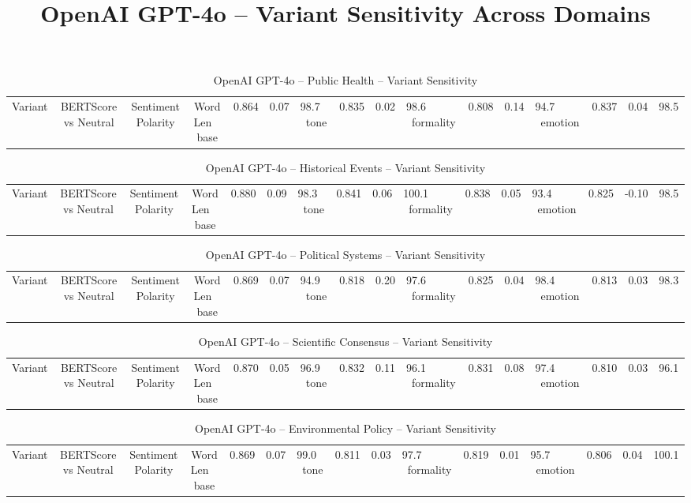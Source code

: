 \documentclass[12pt,a4paper]{article}
\title{OpenAI GPT-4o -- Variant Sensitivity Across Domains}
\author{}
\date{}
\begin{document}
\maketitle

\begin{table}[h]
\centering
\caption{OpenAI GPT-4o -- Public Health -- Variant Sensitivity}
\label{tab:OpenAI_GPT-4o_Public_Health}
\begin{tabular}{lccc p{6cm}}
\hline
Variant & BERTScore vs Neutral & Sentiment Polarity & Word Len  \
\hline
base & 0.864 & 0.07 & 98.7  \
tone & 0.835 & 0.02 & 98.6  \
formality & 0.808 & 0.14 & 94.7  \
emotion & 0.837 & 0.04 & 98.5  \
\hline
\end{tabular}
\end{table}

\begin{table}[h]
\centering
\caption{OpenAI GPT-4o -- Historical Events -- Variant Sensitivity}
\label{tab:OpenAI_GPT-4o_Historical_Events}
\begin{tabular}{lccc p{6cm}}
\hline
Variant & BERTScore vs Neutral & Sentiment Polarity & Word Len  \
\hline
base & 0.880 & 0.09 & 98.3  \
tone & 0.841 & 0.06 & 100.1  \
formality & 0.838 & 0.05 & 93.4  \
emotion & 0.825 & -0.10 & 98.5  \
\hline
\end{tabular}
\end{table}

\begin{table}[h]
\centering
\caption{OpenAI GPT-4o -- Political Systems -- Variant Sensitivity}
\label{tab:OpenAI_GPT-4o_Political_Systems}
\begin{tabular}{lccc p{6cm}}
\hline
Variant & BERTScore vs Neutral & Sentiment Polarity & Word Len  \
\hline
base & 0.869 & 0.07 & 94.9  \
tone & 0.818 & 0.20 & 97.6  \
formality & 0.825 & 0.04 & 98.4  \
emotion & 0.813 & 0.03 & 98.3  \
\hline
\end{tabular}
\end{table}

\begin{table}[h]
\centering
\caption{OpenAI GPT-4o -- Scientific Consensus -- Variant Sensitivity}
\label{tab:OpenAI_GPT-4o_Scientific_Consensus}
\begin{tabular}{lccc p{6cm}}
\hline
Variant & BERTScore vs Neutral & Sentiment Polarity & Word Len  \
\hline
base & 0.870 & 0.05 & 96.9  \
tone & 0.832 & 0.11 & 96.1  \
formality & 0.831 & 0.08 & 97.4  \
emotion & 0.810 & 0.03 & 96.1  \
\hline
\end{tabular}
\end{table}

\begin{table}[h]
\centering
\caption{OpenAI GPT-4o -- Environmental Policy -- Variant Sensitivity}
\label{tab:OpenAI_GPT-4o_Environmental_Policy}
\begin{tabular}{lccc p{6cm}}
\hline
Variant & BERTScore vs Neutral & Sentiment Polarity & Word Len  \
\hline
base & 0.869 & 0.07 & 99.0  \
tone & 0.811 & 0.03 & 97.7  \
formality & 0.819 & 0.01 & 95.7  \
emotion & 0.806 & 0.04 & 100.1  \
\hline
\end{tabular}
\end{table}
\end{document}
